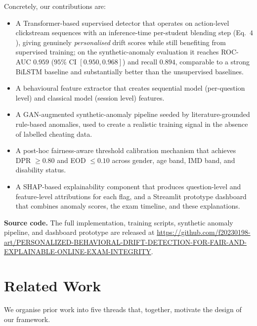 \documentclass[sigconf]{acmart}
\begin{document}
Concretely, our contributions are:
\begin{itemize}
    \item A Transformer-based supervised detector that operates on action-level clickstream sequences with an inference-time per-student blending step (Eq.~$4$), giving genuinely \emph{personalised} drift scores while still benefiting from supervised training; on the synthetic-anomaly evaluation it reaches ROC-AUC $0.959$ ($95\%$ CI $[0.950, 0.968]$) and recall $0.894$, comparable to a strong BiLSTM baseline and substantially better than the unsupervised baselines.
    \item  A behavioural feature extractor that creates sequential model (per-question level) and classical model (session level) features.
    \item A GAN-augmented synthetic-anomaly pipeline seeded by literature-grounded rule-based anomalies, used to create a realistic training signal in the absence of labelled cheating data.
    \item A post-hoc fairness-aware threshold calibration mechanism that achieves DPR $\geq 0.80$ and EOD $\leq 0.10$ across gender, age band, IMD band, and disability status.
    \item A SHAP-based explainability component that produces question-level and feature-level attributions for each flag, and a Streamlit prototype dashboard that combines anomaly scores, the exam timeline, and these explanations.
    
\end{itemize}
\noindent\textbf{Source code.} The full implementation, training scripts, synthetic anomaly pipeline, and dashboard prototype are released at \url{https://github.com/f20230198-art/PERSONALIZED-BEHAVIORAL-DRIFT-DETECTION-FOR-FAIR-AND-EXPLAINABLE-ONLINE-EXAM-INTEGRITY}.


\section{Related Work}
\label{sec:related}

We organise prior work into five threads that, together, motivate the design of our framework.
\end{document}

